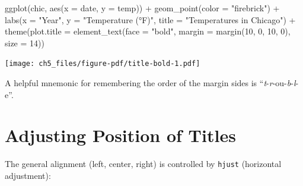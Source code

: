 \documentclass[
  letterpaper,
]{scrbook}
\newenvironment{Shaded}{\begin{snugshade}}{\end{snugshade}}
\newcommand{\AttributeTok}[1]{\textcolor[rgb]{0.40,0.45,0.13}{#1}}
\newcommand{\DecValTok}[1]{\textcolor[rgb]{0.68,0.00,0.00}{#1}}
\newcommand{\FunctionTok}[1]{\textcolor[rgb]{0.28,0.35,0.67}{#1}}
\newcommand{\NormalTok}[1]{\textcolor[rgb]{0.00,0.23,0.31}{#1}}
\newcommand{\SpecialCharTok}[1]{\textcolor[rgb]{0.37,0.37,0.37}{#1}}
\newcommand{\StringTok}[1]{\textcolor[rgb]{0.13,0.47,0.30}{#1}}
\begin{document}
\begin{Shaded}
\begin{Highlighting}[]
\FunctionTok{ggplot}\NormalTok{(chic, }\FunctionTok{aes}\NormalTok{(}\AttributeTok{x =}\NormalTok{ date, }\AttributeTok{y =}\NormalTok{ temp)) }\SpecialCharTok{+}
  \FunctionTok{geom\_point}\NormalTok{(}\AttributeTok{color =} \StringTok{"firebrick"}\NormalTok{) }\SpecialCharTok{+}
  \FunctionTok{labs}\NormalTok{(}\AttributeTok{x =} \StringTok{"Year"}\NormalTok{, }\AttributeTok{y =} \StringTok{"Temperature (°F)"}\NormalTok{,}
       \AttributeTok{title =} \StringTok{"Temperatures in Chicago"}\NormalTok{) }\SpecialCharTok{+}
  \FunctionTok{theme}\NormalTok{(}\AttributeTok{plot.title =} \FunctionTok{element\_text}\NormalTok{(}\AttributeTok{face =} \StringTok{"bold"}\NormalTok{,}
                                  \AttributeTok{margin =} \FunctionTok{margin}\NormalTok{(}\DecValTok{10}\NormalTok{, }\DecValTok{0}\NormalTok{, }\DecValTok{10}\NormalTok{, }\DecValTok{0}\NormalTok{),}
                                  \AttributeTok{size =} \DecValTok{14}\NormalTok{))}
\end{Highlighting}
\end{Shaded}

\texttt{[image: ch5\_files/figure-pdf/title-bold-1.pdf]}

\begin{tcolorbox}[enhanced jigsaw, toprule=.15mm, bottomtitle=1mm, coltitle=black, breakable, colbacktitle=quarto-callout-tip-color!10!white, opacityback=0, toptitle=1mm, colframe=quarto-callout-tip-color-frame, titlerule=0mm, title=\textcolor{quarto-callout-tip-color}{\faLightbulb}\hspace{0.5em}{Having trouble with Margins?}, bottomrule=.15mm, arc=.35mm, opacitybacktitle=0.6, leftrule=.75mm, left=2mm, rightrule=.15mm, colback=white]

A helpful mnemonic for remembering the order of the margin sides is
``\emph{t}-\emph{r}-ou-\emph{b}-\emph{l}-e''.

\end{tcolorbox}

\section{Adjusting Position of
Titles}\label{adjusting-position-of-titles}

The general alignment (left, center, right) is controlled by
\texttt{hjust} (horizontal adjustment):
\end{document}
